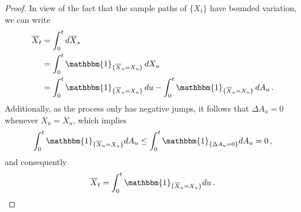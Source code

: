 \documentclass[titlepage]{article}
\theoremstyle{plain}
\theoremstyle{definition}
\begin{document}
\begin{proof}
  In view of the fact that the sample paths of $\{ X_t \}$ have bounded variation, we can write
  \begin{align}
    \overline{X}_t & = \int_0^t d\overline{X}_s                                                                                                \\
                   & = \int_0^t \mathbbm{1}_{\{ \overline{X}_u = X_u \}} \, dX_u                                                               \\
                   & = \int_0^t \mathbbm{1}_{\{ \overline{X}_u = X_u \}} \, du - \int_0^t \mathbbm{1}_{\{ \overline{X}_u = X_u \}} \, dA_u \,.
  \end{align}
  Additionally, as the process only has negative jumps, it follows that $\Delta A_u = 0$ whenever $\overline{X}_u = X_u$, which implies
  \begin{equation}
    \int_0^t \mathbbm{1}_{\{ \overline{X}_u = X_u \}} dA_u \leq \int_0^t \mathbbm{1}_{\{ \Delta A_u = 0 \}} dA_u = 0 \,,
  \end{equation}
  and consequently
  \begin{equation}
    \overline{X}_t = \int_0^t \mathbbm{1}_{\{ \overline{X}_u = X_u \}} du \,.
  \end{equation}


\end{proof}
\end{document}

